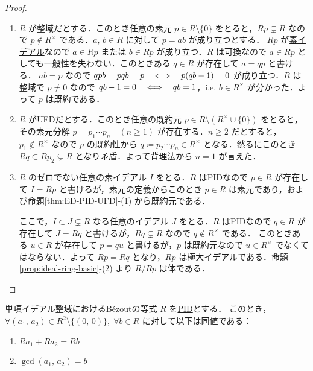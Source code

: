\documentclass[rep_main]{subfiles}
\begin{document}
\begin{proof}
    \begin{enumerate}
        \item $R$ が整域だとする．このとき任意の素元 $p \in R \setminus \{0\}$ をとると，$Rp \subsetneq R$ なので $p \notin R^\times$ である．$a,\, b \in R$ に対して $p = ab$ が成り立つとする．
        $Rp$ が\hyperref[def:ideal-ring]{素イデアル}なので $a \in Rp$ または $b \in Rp$ が成り立つ．$R$ は可換なので $a \in Rp$ としても一般性を失わない．このときある $q \in R$ が存在して $a = qp$ と書ける．
        $ab = p$ なので $qpb = pqb = p \quad \Longleftrightarrow \quad p(qb-1) = 0$ が成り立つ．$R$ は整域で $p \neq 0$ なので $qb-1 = 0 \quad \Longleftrightarrow \quad qb = 1$，i.e. $b \in R^\times$ が分かった．よって $p$ は既約である．
        \item $R$ がUFDだとする．このとき任意の既約元 $p \in R \setminus (R^\times \cup \{0\})$ をとると，その素元分解 $p = p_1 \cdots p_n\quad (n \ge 1)$ が存在する．$n \ge 2$ だとすると，$p_1 \notin R^\times$ なので $p$ の既約性から $q \coloneqq p_2 \cdots p_n \in R^\times$ となる．然るにこのとき $Rq \subset Rp_2 \subsetneq R$ となり矛盾．よって背理法から $n=1$ が言えた．
        \item $R$ のゼロでない任意の素イデアル $I$ をとる．$R$ はPIDなので $p \in R$ が存在して $I = Rp$ と書けるが，素元の定義からこのとき $p \in R$ は素元であり，および命題\ref{thm:ED-PID-UFD}-(1) から既約元である．
        
        ここで，$I \subset J \subsetneq R$ なる任意のイデアル $J$ をとる．$R$ はPIDなので $q \in R$ が存在して $J = Rq$ と書けるが，$Rq \subsetneq R$ なので $q \notin R^\times$ である．
        このときある $u \in R$ が存在して $p = qu$ と書けるが，$p$ は既約元なので $u \in R^\times$ でなくてはならない．よって $Rp = Rq$ となり，$Rp$ は極大イデアルである．命題\ref{prop:ideal-ring-basic}-(2) より $R/Rp$ は体である．
    \end{enumerate}
\end{proof}


\begin{myprop}[label=prop:PID-Bezout]{単項イデアル整域におけるB\'{e}zoutの等式}
    $R$ を\hyperref[def:domains]{PID}とする．
    このとき，$\forall (a_1,\, a_2) \in R^2  \setminus \{(0,\, 0)\},\; \forall b \in R$ に対して以下は同値である：
    \begin{enumerate}
        \item $Ra_1 + Ra_2 = Rb$
        \item $\mathrm{\gcd}(a_1,\, a_2) = b$
    \end{enumerate}
\end{myprop}
\end{document}
